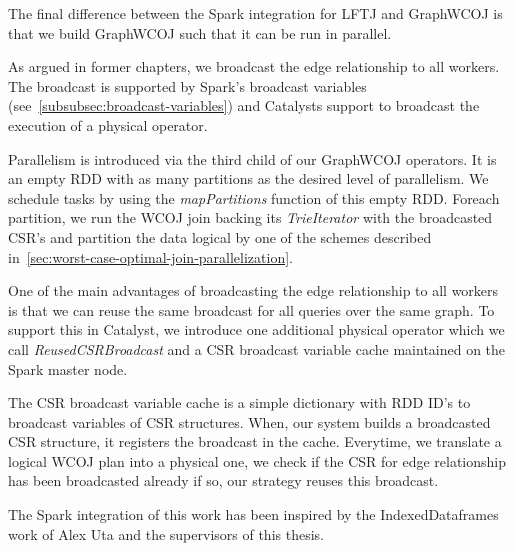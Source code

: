 The final difference between the Spark integration for \textsc{LFTJ} and GraphWCOJ is that we build GraphWCOJ such that it can
be run in parallel.

As argued in former chapters, we broadcast the edge relationship to all workers.
The broadcast is supported by Spark's broadcast variables (see~\cref{subsubsec:broadcast-variables}) and Catalysts support to broadcast
the execution of a physical operator.

Parallelism is introduced via the third child of our GraphWCOJ operators.
It is an empty RDD with as many partitions as the desired level of parallelism.
We schedule tasks by using the \textit{mapPartitions} function of this empty RDD.
Foreach partition, we run the \textsc{WCOJ} join backing its \textit{TrieIterator} with the broadcasted CSR's and partition the data
logical by one of the schemes described in~\cref{sec:worst-case-optimal-join-parallelization}.


One of the main advantages of broadcasting the edge relationship to all workers is that we can reuse the same broadcast for all queries
over the same graph.
To support this in Catalyst, we introduce one additional physical operator which we call \textit{ReusedCSRBroadcast} and a CSR broadcast
variable cache maintained on the Spark master node.

The CSR broadcast variable cache is a simple dictionary with RDD ID's to broadcast variables of CSR structures.
When, our system builds a broadcasted CSR structure, it registers the broadcast in the cache.
Everytime, we translate a logical WCOJ plan into a physical one, we check if the CSR for edge relationship has been broadcasted already
if so, our strategy reuses this broadcast.






The Spark integration of this work has been inspired by the IndexedDataframes~\cite{indexed-dataframes} work of Alex Uta and the supervisors
of this thesis.


